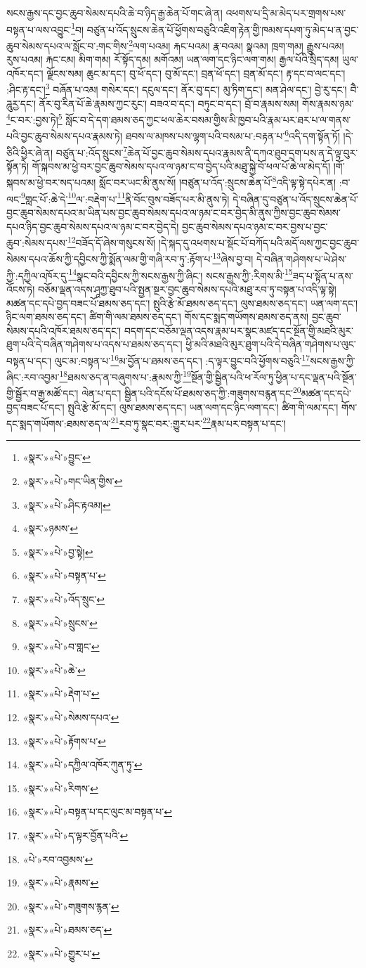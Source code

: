 སངས་རྒྱས་དང་བྱང་ཆུབ་སེམས་དཔའི་ཆེ་བ་ཉིད་རྒྱ་ཆེན་པོ་གང་ཞེ་ན། འཕགས་པ་དྲི་མ་མེད་པར་གྲགས་པས་བསྟན་པ་ལས་འབྱུང་\footnote{«སྣར་»«པེ་»བྱུང་}བ། བཙུན་པ་འོད་སྲུངས་ཆེན་པོ་ཕྱོགས་བཅུའི་འཇིག་རྟེན་གྱི་ཁམས་དཔག་ཏུ་མེད་པ་ན་བྱང་ཆུབ་སེམས་དཔའ་ལ་སློང་བ་:གང་གིས་\footnote{«སྣར་»«པེ་»གང་ཡིན་གྱིས་}ལག་པའམ། རྐང་པའམ། རྣ་བའམ། སྣའམ། ཁྲག་གམ། རྒྱུས་པའམ། རུས་པའམ། རྐང་ངམ། མིག་གམ། རོ་སྟོད་དམ། མགོའམ། ཡན་ལག་དང་ཉིང་ལག་གམ། རྒྱལ་པོའི་སྲིད་དམ། ཡུལ་འཁོར་དང་། ལྗོངས་སམ། ཆུང་མ་དང་། བུ་ཕོ་དང་། བུ་མོ་དང་། བྲན་ཕོ་དང་། བྲན་མོ་དང་། རྟ་དང་བ་ལང་དང་། :ཤིང་རྟ་དང་།\footnote{«སྣར་»«པེ་»ཤིང་རྟའམ།} བཞོན་པ་འམ། གསེར་དང་། དངུལ་དང་། ནོར་བུ་དང་། མུ་ཏིག་དང་། མན་ཤེལ་དང་། བྱེ་རུ་དང་། བཻ་ཌཱུརྱ་དང་། ནོར་བུ་རིན་པོ་ཆེ་རྣམས་ཀྱང་རུང་། བཟའ་བ་དང་། བཏུང་བ་དང་། བྲོ་བ་རྣམས་སམ། གོས་རྣམས་ཉམ་\footnote{«སྣར་»ཉམས་}ང་བར་:བྱས་ཏེ།\footnote{«སྣར་»«པེ་»བྱ་སྟེ།} སློང་བ་དེ་དག་ཐམས་ཅད་ཀྱང་ཕལ་ཆེར་བསམ་གྱིས་མི་ཁྱབ་པའི་རྣམ་པར་ཐར་པ་ལ་གནས་པའི་བྱང་ཆུབ་སེམས་དཔའ་རྣམས་ཏེ། ཐབས་ལ་མཁས་པས་ལྷག་པའི་བསམ་པ་:བརྟན་པ་\footnote{«སྣར་»«པེ་»བསྟན་པ་}འདི་དག་སྟོན་ཏོ། །དེ་ཅིའི་ཕྱིར་ཞེ་ན། བཙུན་པ་:འོད་སྲུངས་\footnote{«སྣར་»«པེ་»འོད་སྲུང་}ཆེན་པོ་བྱང་ཆུབ་སེམས་དཔའ་རྣམས་ནི་དཀའ་ཐུབ་དྲག་པས་ན་དེ་ལྟ་བུར་སྟོན་ཏེ། གོ་སྐབས་མ་ཕྱེ་བར་བྱང་ཆུབ་སེམས་དཔའ་ལ་ཉམ་ང་བ་བྱེད་པའི་མཐུ་སྐྱེ་བོ་ཕལ་པོ་ཆེ་ལ་མེད་དོ། །གོ་སྐབས་མ་ཕྱེ་བར་སད་པའམ། སློང་བར་ཡང་མི་ནུས་སོ། །བཙུན་པ་འོད་:སྲུངས་ཆེན་པོ་\footnote{«སྣར་»«པེ་»སྲུངས་}འདི་ལྟ་སྟེ་དཔེར་ན། :བ་ལང་\footnote{«སྣར་»«པེ་»བ་གླང་}གླང་པོ་:ཆེ་དེ་\footnote{«སྣར་»«པེ་»ཆེ་}ལ་:བརྡེག་པ་\footnote{«སྣར་»«པེ་»རྡེག་པ་}ནི་བོང་བུས་བཟོད་པར་མི་ནུས་ཏེ། དེ་བཞིན་དུ་བཙུན་པ་འོད་སྲུངས་ཆེན་པོ་བྱང་ཆུབ་སེམས་དཔའ་མ་ཡིན་པས་བྱང་ཆུབ་སེམས་དཔའ་ལ་ཉམ་ང་བར་བྱེད་མི་ནུས་ཀྱིས་བྱང་ཆུབ་སེམས་དཔའ་ཉིད་བྱང་ཆུབ་སེམས་དཔའ་ལ་ཉམ་ང་བར་བྱེད་དེ། བྱང་ཆུབ་སེམས་དཔའ་ཉམ་ང་བར་བྱས་པ་བྱང་ཆུབ་:སེམས་དཔས་\footnote{«སྣར་»«པེ་»སེམས་དཔའ་}བཟོད་དོ་ཞེས་གསུངས་སོ། །དེ་སྐད་དུ་འཕགས་པ་སྡོང་པོ་བཀོད་པའི་མདོ་ལས་ཀྱང་བྱང་ཆུབ་སེམས་དཔའ་ཆོས་ཀྱི་དབྱིངས་ཀྱི་སྨོན་ལམ་གྱི་གཞི་རབ་ཏུ་:རྟོག་པ་\footnote{«སྣར་»«པེ་»རྟོགས་པ་}ཞེས་བྱ་བ། དེ་བཞིན་གཤེགས་པ་ཡེ་ཤེས་ཀྱི་:དཀྱིལ་འཁོར་དུ་\footnote{«སྣར་»«པེ་»དཀྱིལ་འཁོར་ཀུན་ཏུ་}སྣང་བའི་དབྱིངས་ཀྱི་སངས་རྒྱས་ཀྱི་ཞིང་། སངས་རྒྱས་ཀྱི་:རིགས་མི་\footnote{«སྣར་»«པེ་»རིགས་}ཟད་པ་སྟོན་པ་ནས་འོངས་ཏེ། བཅོམ་ལྡན་འདས་ཤཱཀྱ་ཐུབ་པའི་སྤྱན་སྔར་བྱང་ཆུབ་སེམས་དཔའི་མཐུ་རབ་ཏུ་བསྟན་པ་འདི་ལྟ་སྟེ། མཚན་དང་དཔེ་བྱད་བཟང་པོ་ཐམས་ཅད་དང་། སྤུའི་རྩེ་མོ་ཐམས་ཅད་དང་། ལུས་ཐམས་ཅད་དང་། ཡན་ལག་དང་། ཉིང་ལག་ཐམས་ཅད་དང་། ཚིག་གི་ལམ་ཐམས་ཅད་དང་། གོས་དང་སྨད་གཡོགས་ཐམས་ཅད་ནས། བྱང་ཆུབ་སེམས་དཔའི་འཁོར་ཐམས་ཅད་དང་། བདག་དང་བཅོམ་ལྡན་འདས་རྣམ་པར་སྣང་མཛད་དང་སྔོན་གྱི་མཐའི་མུར་ཐུག་པའི་དེ་བཞིན་གཤེགས་པ་འདས་པ་ཐམས་ཅད་དང་། ཕྱི་མའི་མཐའི་མུར་ཐུག་པའི་དེ་བཞིན་གཤེགས་པ་ལུང་བསྟན་པ་དང་། ལུང་མ་:བསྟན་པ་\footnote{«སྣར་»«པེ་»བསྟན་པ་དང་ལུང་མ་བསྟན་པ་}མ་བྱོན་པ་ཐམས་ཅད་དང་། :ད་ལྟར་བྱུང་བའི་ཕྱོགས་བཅུའི་\footnote{«སྣར་»«པེ་»ད་ལྟར་བྱོན་པའི་}སངས་རྒྱས་ཀྱི་ཞིང་:རབ་འབྱམ་\footnote{«པེ་»རབ་འབྱམས་}ཐམས་ཅད་ན་བཞུགས་པ་:རྣམས་ཀྱི་\footnote{«སྣར་»«པེ་»རྣམས་}སྔོན་གྱི་སྦྱིན་པའི་ཕ་རོལ་ཏུ་ཕྱིན་པ་དང་ལྡན་པའི་སྔོན་གྱི་སྦྱོར་བ་རྒྱ་མཚོ་དང་། ལེན་པ་དང་། སྦྱིན་པའི་དངོས་པོ་ཐམས་ཅད་ཀྱི་:གཟུགས་བརྙན་དང་\footnote{«སྣར་»«པེ་»གཟུགས་རྙན་}མཚན་དང་དཔེ་བྱད་བཟང་པོ་དང་། སྤུའི་རྩེ་མོ་དང་། ལུས་ཐམས་ཅད་དང་། ཡན་ལག་དང་ཉིང་ལག་དང་། ཚིག་གི་ལམ་དང་། གོས་དང་སྨད་གཡོགས་:ཐམས་ཅད་ལ་\footnote{«སྣར་»«པེ་»ཐམས་ཅད་}རབ་ཏུ་སྣང་བར་:གྱུར་པར་\footnote{«སྣར་»«པེ་»གྱུར་པ་}རྣམ་པར་བསྟན་པ་དང་། 